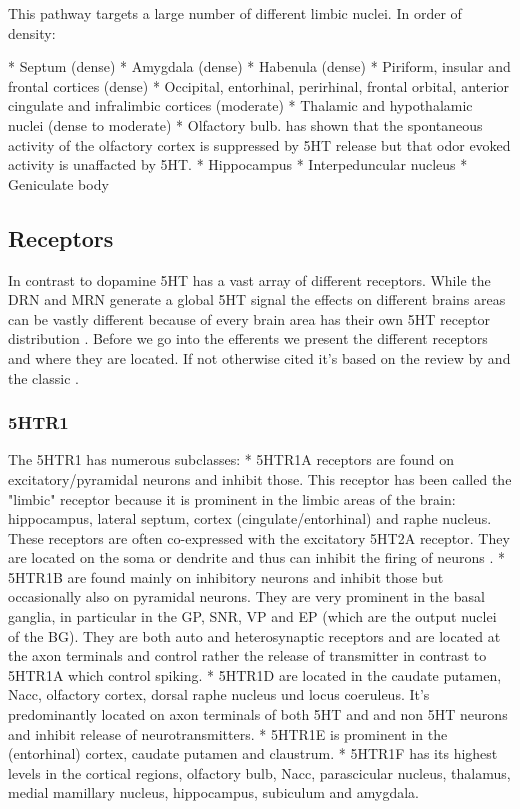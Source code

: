 \documentclass[12pt,a4paper]{article}
\begin{document}
This pathway targets a large number of different limbic nuclei. In order of density:

  * Septum (dense)
  * Amygdala (dense)
  * Habenula (dense)
  * Piriform, insular and frontal cortices (dense)
  * Occipital, entorhinal, perirhinal, frontal orbital, anterior cingulate and infralimbic cortices (moderate)
  * Thalamic and hypothalamic nuclei (dense to moderate)
  * Olfactory bulb. \citep{Lottem2016} has shown that the spontaneous activity of the olfactory cortex is suppressed by 5HT release but that odor evoked activity is unaffacted by 5HT.
  * Hippocampus
  * Interpeduncular nucleus
  * Geniculate body


\subsection{Receptors}

In contrast to dopamine 5HT has a vast array of different receptors. While the DRN and MRN generate a global 5HT signal the effects on different brains areas can be vastly different because of every brain area has their own 5HT receptor distribution \citep{Palacios1990} \citep{Carhart-Harris2017}. Before we go into the efferents we present the different receptors and where they are located. If not otherwise cited it's based on the review by \citep{Mengod2010} and the classic \citep{Palacios1990}.

\subsubsection{5HTR1}

The 5HTR1 has numerous subclasses:
  * 5HTR1A receptors are found on excitatory/pyramidal neurons and inhibit those. This receptor has been called the "limbic" receptor because it is prominent in the limbic areas of the brain: hippocampus, lateral septum, cortex (cingulate/entorhinal) and raphe nucleus. These receptors are often co-expressed with the excitatory 5HT2A receptor. They are located on the soma or dendrite and thus can inhibit the firing of neurons \citep{Riad2000}.
  * 5HTR1B are found mainly on inhibitory neurons and inhibit those but occasionally also on pyramidal neurons. They are very prominent in the basal ganglia, in particular in the GP, SNR, VP and EP (which are the output nuclei of the BG). They are both auto and heterosynaptic receptors and are located at the axon terminals \citep{Riad2000} and control rather the release of transmitter in contrast to 5HTR1A which control spiking.
  * 5HTR1D are located in the caudate putamen, Nacc, olfactory cortex, dorsal raphe nucleus und locus coeruleus. It's predominantly located on axon terminals of both 5HT and and non 5HT neurons and inhibit release of neurotransmitters.
  * 5HTR1E is prominent in the (entorhinal) cortex, caudate putamen and claustrum.
  * 5HTR1F has its highest levels in the cortical regions, olfactory bulb, Nacc, parascicular nucleus, thalamus, medial mamillary nucleus, hippocampus, subiculum and amygdala.
\end{document}
